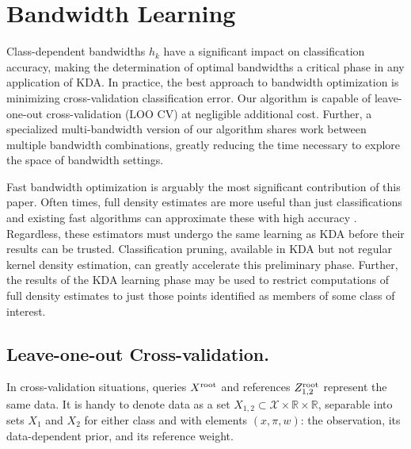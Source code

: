 \documentclass[twoside,leqno,twocolumn]{article}
\newcommand{\kdroot}[1]{#1^{\rm root}}
\begin{document}
\section{Bandwidth Learning}\label{sec:bw}
Class-dependent bandwidths $h_k$ have a significant impact on
classification accuracy, making the determination of optimal
bandwidths a critical phase in any application of KDA.  In practice,
the best approach to bandwidth optimization is minimizing
cross-validation classification error.  Our algorithm is capable of
leave-one-out cross-validation (LOO CV) at negligible additional cost.
Further, a specialized multi-bandwidth version of our algorithm shares
work between multiple bandwidth combinations, greatly reducing the
time necessary to explore the space of bandwidth settings.

Fast bandwidth optimization is arguably the most significant
contribution of this paper.  Often times, full density estimates are
more useful than just classifications and existing fast algorithms can
approximate these with high accuracy \cite{nips2000paper, kde-siamdm,
kde-nips-dong, kde-uai-dong}.  Regardless, these estimators must
undergo the same learning as KDA before their results can be trusted.
Classification pruning, available in KDA but not regular kernel
density estimation, can greatly accelerate this preliminary phase.
Further, the results of the KDA learning phase may be used to restrict
computations of full density estimates to just those points identified
as members of some class of interest.

\subsection{Leave-one-out Cross-validation.}
In cross-validation situations, queries $\kdroot{X}$ and references
$\kdroot{Z}_{1,2}$ represent the same data.  It is handy to denote
data as a set $X_{1,2} \subset \mathcal{X} \times \mathbb{R} \times
\mathbb{R}$, separable into sets $X_1$ and $X_2$ for either class and
with elements $(x,\pi,w)$: the observation, its data-dependent prior,
and its reference weight.
\end{document}
